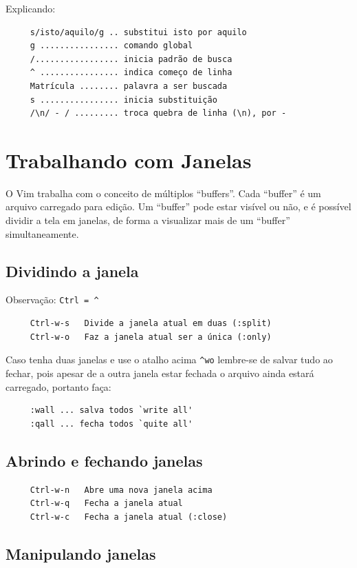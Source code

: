 \documentclass[10pt,a4paper,openany]{book}
\begin{document}
Explicando:

\begin{verbatim}
     s/isto/aquilo/g .. substitui isto por aquilo
     g ................ comando global
     /................. inicia padrão de busca
     ^ ................ indica começo de linha
     Matrícula ........ palavra a ser buscada
     s ................ inicia substituição
     /\n/ - / ......... troca quebra de linha (\n), por -
\end{verbatim}

\chapter{Trabalhando com Janelas}\label{cha:Trabalhando com janelas}

O Vim trabalha com o conceito de múltiplos ``buffers''. Cada
``buffer'' é um arquivo carregado para edição. Um ``buffer'' pode
estar visível ou não, e é possível dividir a tela em janelas, de forma
a visualizar mais de um ``buffer'' simultaneamente.

\section{Dividindo a janela }
Observação: \verb+Ctrl = ^+

\begin{verbatim}
     Ctrl-w-s   Divide a janela atual em duas (:split)
     Ctrl-w-o   Faz a janela atual ser a única (:only)
\end{verbatim}

Caso tenha duas janelas e use o atalho acima \verb|^wo| lembre-se de salvar
tudo ao fechar, pois apesar de a outra janela estar fechada o arquivo
ainda estará carregado, portanto faça:

\begin{verbatim}
     :wall ... salva todos `write all'
     :qall ... fecha todos `quite all'
\end{verbatim}

\section{Abrindo e fechando janelas }

\begin{verbatim}
     Ctrl-w-n   Abre uma nova janela acima
     Ctrl-w-q   Fecha a janela atual
     Ctrl-w-c   Fecha a janela atual (:close)
\end{verbatim}

\section{Manipulando janelas }
\end{document}
